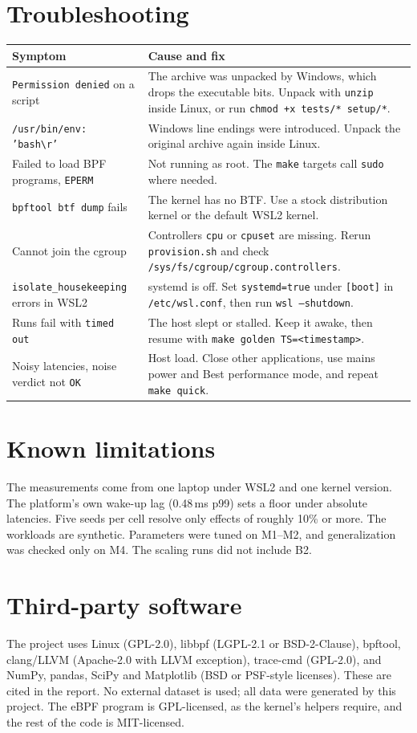 \documentclass[10.5pt,a4paper]{article}
\newcommand{\f}[1]{\texttt{#1}}
\begin{document}
\section{Troubleshooting}
\begin{tabularx}{\textwidth}{@{}l L@{}}
\toprule
\textbf{Symptom} & \textbf{Cause and fix} \\
\midrule
\f{Permission denied} on a script & The archive was unpacked by Windows, which drops the executable bits. Unpack with \f{unzip} inside Linux, or run \f{chmod +x tests/* setup/*}. \\
\f{/usr/bin/env: 'bash\textbackslash r'} & Windows line endings were introduced. Unpack the original archive again inside Linux. \\
Failed to load BPF programs, \f{EPERM} & Not running as root. The \f{make} targets call \f{sudo} where needed. \\
\f{bpftool btf dump} fails & The kernel has no BTF. Use a stock distribution kernel or the default WSL2 kernel. \\
Cannot join the cgroup & Controllers \f{cpu} or \f{cpuset} are missing. Rerun \f{provision.sh} and check \f{/sys/fs/cgroup/cgroup.controllers}. \\
\f{isolate\_housekeeping} errors in WSL2 & systemd is off. Set \f{systemd=true} under \f{[boot]} in \f{/etc/wsl.conf}, then run \f{wsl --shutdown}. \\
Runs fail with \f{timed out} & The host slept or stalled. Keep it awake, then resume with \f{make golden TS=<timestamp>}. \\
Noisy latencies, noise verdict not \f{OK} & Host load. Close other applications, use mains power and Best performance mode, and repeat \f{make quick}. \\
\bottomrule
\end{tabularx}

\section{Known limitations}
The measurements come from one laptop under WSL2 and one kernel version. The platform's own wake-up lag (0.48\,ms p99) sets a floor under absolute latencies. Five seeds per cell resolve only effects of roughly 10\% or more. The workloads are synthetic. Parameters were tuned on M1--M2, and generalization was checked only on M4. The scaling runs did not include B2.

\section{Third-party software}
The project uses Linux (GPL-2.0), libbpf (LGPL-2.1 or BSD-2-Clause), bpftool, clang/LLVM (Apache-2.0 with LLVM exception), trace-cmd (GPL-2.0), and NumPy, pandas, SciPy and Matplotlib (BSD or PSF-style licenses). These are cited in the report. No external dataset is used; all data were generated by this project. The eBPF program is GPL-licensed, as the kernel's helpers require, and the rest of the code is MIT-licensed.
\end{document}
